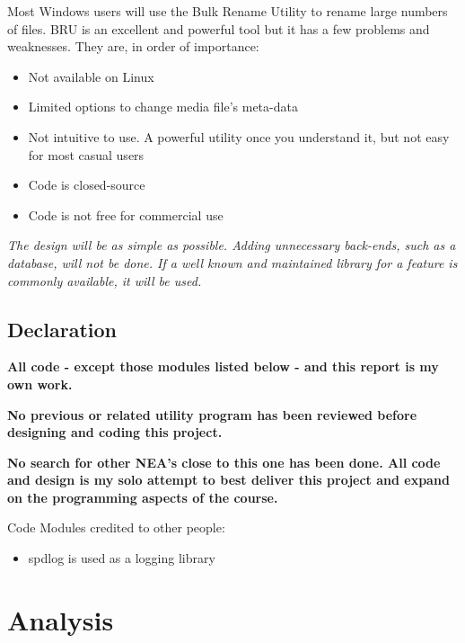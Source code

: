 \documentclass[11pt]{article}
\begin{document}
Most Windows users will use the Bulk Rename Utility\cite{BulkRenameUtility} to rename large numbers of files.
BRU is an excellent and powerful tool but it has a few problems and weaknesses. They are, in order of importance:
\begin{itemize}
    \item Not available on Linux
    \item Limited options to change media file's meta-data
    \item Not intuitive to use. A powerful utility once you understand it, but not easy for most casual users
    \item Code is closed-source
    \item Code is not free for commercial use
\end{itemize}





\textit{The design will be as simple as possible. Adding unnecessary back-ends, such as a database, will not be done. If a well known and maintained library for a feature is commonly available, it will be used.}
\subsection{Declaration}
\textbf{All code - except those modules listed below - and this report is my own work.}

\textbf{No previous or related utility program has been reviewed before designing and coding this project. }

\textbf{No search for other NEA's close to this one has been done. All code and design is my solo attempt to best deliver this project and expand on the programming aspects of the course.}


Code Modules credited to other people:
\begin{itemize}
    \item spdlog\cite{spdlog} is used as a logging library
\end{itemize}

\section{Analysis}
\end{document}

